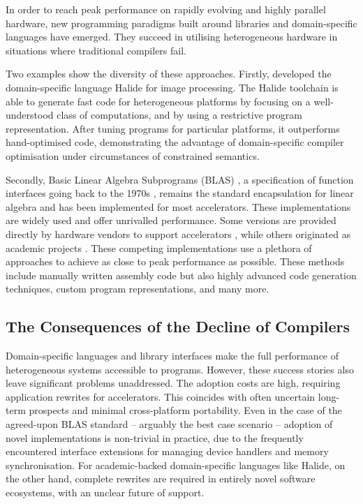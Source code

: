     In order to reach peak performance on rapidly evolving and highly parallel
    hardware, new programming paradigms built around libraries and
    domain-specific languages have emerged.
    They succeed in utilising heterogeneous hardware in situations where
    traditional compilers fail.

    Two examples show the diversity of these approaches.
    Firstly, \citet{Ragan-Kelley2013Halide} developed the domain-specific
    language Halide for image processing.
    The Halide toolchain is able to generate fast code for heterogeneous
    platforms by focusing on a well-understood class of computations, and by
    using a restrictive program representation.
    After tuning programs for particular platforms, it outperforms
    hand-optimised code, demonstrating the advantage of domain-specific compiler
    optimisation under circumstances of constrained semantics.

    Secondly, Basic Linear Algebra Subprograms (BLAS)
    \citep{2002:USB:567806.567807}, a specification of function interfaces
    going back to the 1970s \citep{Lawson:1979:BLA:355841.355847},
    remains the standard encapsulation for linear algebra and has been
    implemented for most accelerators.
    These implementations are widely used and offer unrivalled performance.
    Some versions are provided directly by hardware vendors to support
    accelerators \citep{mkl,cublas,clblas,apl,qml}, while others originated as
    academic projects \citep{Wang:2013:AAG:2503210.2503219}.
    These competing implementations use a plethora of approaches to achieve as
    close to peak performance as possible.
    These methods include manually written assembly code but also highly
    advanced code generation techniques, custom program representations, and
    many more.

\subsection{The Consequences of the Decline of Compilers}

    Domain-specific languages and library interfaces make the full performance
    of heterogeneous systems accessible to programs.
    However, these success stories also leave significant problems unaddressed.
    The adoption costs are high, requiring application rewrites for
    accelerators.
    This coincides with often uncertain long-term prospects and minimal
    cross-platform portability.
    Even in the case of the agreed-upon BLAS standard -- arguably the best case
    scenario -- adoption of novel implementations is non-trivial in practice,
    due to the frequently encountered interface extensions for managing device
    handlers and memory synchronisation.
    For academic-backed domain-specific languages like Halide, on the other
    hand, complete rewrites are required in entirely novel software ecosystems,
    with an unclear future of support.

